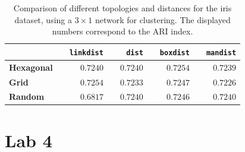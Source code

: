 \documentclass[a4paper, 10pt]{article}
\begin{document}
  \begin{table}[h]
    \centering
    \begin{tabular}{@{}llrrrrrrr@{}}
      \toprule
      & \phantom{ab}  & \texttt{linkdist} & \phantom{ab} & \texttt{dist} & 
      \phantom{ab} & \texttt{boxdist} & \phantom{ab} & \texttt{mandist} \\
      \midrule
      \textbf{Hexagonal} &&  $0.7240$  &&   $0.7240$  &&   $0.7254$  &&  $0.7239$\\
      \textbf{Grid}      &&  $0.7254$  &&   $0.7233$  &&   $0.7247$  &&  $0.7226$\\
      \textbf{Random}    &&  $0.6817$  &&   $0.7240$  &&   $0.7246$  &&  $0.7240$\\
      \bottomrule
    \end{tabular} 
    \caption{Comparison of different topologies and distances for the iris dataset,
    using a $3 \times 1$ network for clustering. The displayed numbers correspond 
  to the ARI index.}
    \label{tab:l3_som_grid}
  \end{table}

\section{Lab 4}
\end{document}

